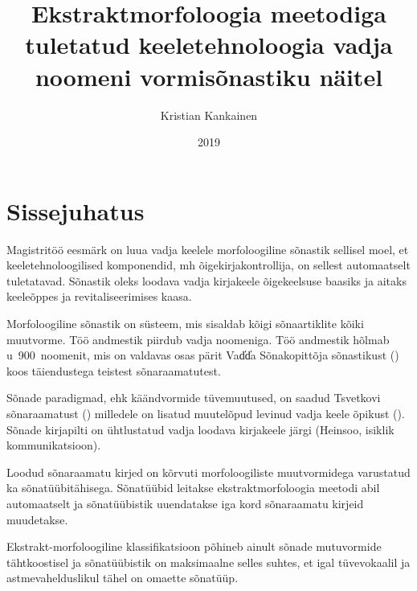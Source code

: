 \documentclass[12pt,a4paper]{article}
\begin{document}
\title{Ekstraktmorfoloogia meetodiga tuletatud keeletehnoloogia vadja noomeni vormisõnastiku näitel}
\author{Kristian Kankainen}
\date{2019}
\maketitle


\newpage
\tableofcontents




\newpage
{}
\section{Sissejuhatus}

Magistritöö eesmärk on luua vadja keelele morfoloogiline sõnastik sellisel moel, et keeletehnoloogilised komponendid, mh õigekirjakontrollija, on sellest automaatselt tuletatavad. Sõnastik oleks loodava vadja kirjakeele õigekeelsuse baasiks ja aitaks keeleõppes ja revitaliseerimises kaasa.

Morfoloogiline sõnastik on süsteem, mis sisaldab kõigi sõnaartiklite kõiki muutvorme. Töö andmestik piirdub vadja noomeniga. Töö andmestik hõlmab u~900~noomenit, mis on valdavas osas pärit Vad̕d̕a Sõnakopittõja sõnastikust (\cite{heinsoo_vadsonakopittoja_2015}) koos täiendustega teistest sõnaraamatutest.

Sõnade paradigmad, ehk käändvormide tüvemuutused, on saadud Tsvetkovi sõnaraamatust (\cite{laakso_vatjan_1989}) milledele on lisatud muutelõpud levinud vadja keele õpikust (\cite{_vadceeli:_2014}). Sõnade kirjapilti on ühtlustatud vadja loodava kirjakeele järgi (Heinsoo, isiklik kommunikatsioon).

Loodud sõnaraamatu kirjed on kõrvuti morfoloogiliste muutvormidega varustatud ka sõnatüübi\-tähisega. Sõnatüübid leitakse ekstraktmorfoloogia meetodi abil automaatselt ja sõnatüübistik uuendatakse iga kord sõnaraamatu kirjeid muudetakse.

Ekstrakt-morfoloogiline klassifikatsioon põhineb ainult sõnade mutuvormide tähtkoostisel ja sõnatüübistik on maksimaalne selles suhtes, et igal tüvevokaalil ja astmevahelduslikul tähel on omaette sõnatüüp.
\end{document}
